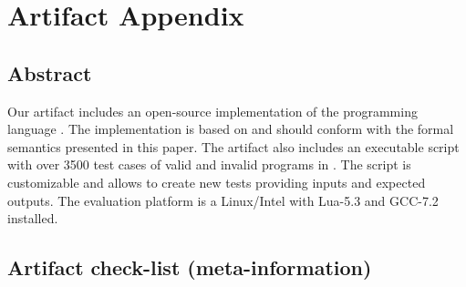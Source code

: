 \section{Artifact Appendix}


\subsection{Abstract}

Our artifact includes an open-source implementation of the programming language
\CEU.
The implementation is based on and should conform with the formal semantics
presented in this paper.
The artifact also includes an executable script with over 3500 test cases of
valid and invalid programs in \CEU.
The script is customizable and allows to create new tests providing inputs and
expected outputs.
The evaluation platform is a Linux/Intel with Lua-5.3 and GCC-7.2 installed.

\subsection{Artifact check-list (meta-information)}

